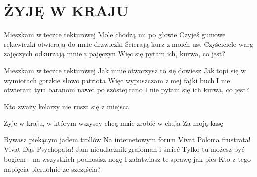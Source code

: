 \documentclass[../../../songbook.tex]{subfiles}
\begin{document}
\TabPositions{11cm} %
\section*{ŻYJĘ W KRAJU}
{}
\vspace{0.5cm}
Mieszkam w teczce tekturowej							 \newline
Mole chodzą mi po głowie								 \newline
Czyjeś gumowe rękawiczki otwierają do mnie drzwiczki	 \newline
Ścierają kurz z moich ust								 \newline
Czyściciele warg zajęczych odkurzają mnie z pajęczyn	 \newline
Więc się pytam ich, kurwa, co jest?						 \newline

Mieszkam w teczce tekturowej						 \newline
Jak mnie otworzysz to się dowiesz						 \newline
Jak topi się w wymiotach gorzkie słowo patriota						 \newline
Więc wypuszczam z mej fajki buch						 \newline
I nie otwieram tym baranom nawet po szóstej rano						 \newline
I nie pytam się ich kurwa, co jest?						 \newline

Kto zważy kolarzy nie rusza się z miejsca				 \newline

\-\hspace{1cm} Żyje w kraju, w którym wszyscy chcą mnie zrobić w chuja	 \newline
\-\hspace{1cm} Za moją kasę						 \newline

Bywasz piekącym jadem trollów						 \newline
Na internetowym forum						 \newline
Vivat Polonia frustrata! Vivat Dąs Psychopata!						 \newline
Jam nieudacznik grafoman i śmieć						 \newline
Tylko tu możesz być bogiem - na wszystkich podnosisz nogę						 \newline
I załatwiasz te sprawę jak pies						 \newline
Kto z tego napięcia pierdolnie ze szczęścia?						 \newline
\end{document}
